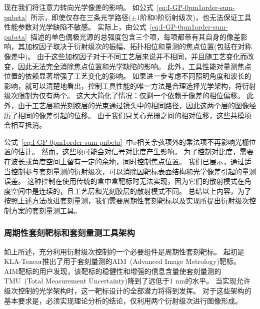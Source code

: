 现在我们将注意力转向光学像差的影响。
如公式~\eqref{eq:I-GP-0pm1order-sum-pnbeta}~所示，即使仅存在三条光学路径($\pm1$阶和$0$阶衍射级次)，也无法保证工具性能参数对光学缺陷不敏感。
实际上，由公式~\eqref{eq:I-GP-0pm1order-sum-pnbeta}~描述的单色偶极光源的总强度包含三个项，每项都带有其自身的像差影响，其加权因子取决于衍射级次的振幅、拓扑相位和量测的焦点位置(包括在对称像差中)。
由于这些加权因子对于不同工艺层来说并不相同，并且随工艺变化而改变，因此无法完全消除焦点位置和光学缺陷的影响。
此外，工具性能对量测焦点位置的依赖显著增强了工艺变化的影响。
如果进一步考虑不同照明角度和波长的影响，就可以清楚地看出，控制工具性能的唯一方法是合理选择光学架构，将衍射级次限制为仅有两个。
这大大简化了情况：仅剩一个依赖于像差的相位偏移。
此外，由于工艺层和光刻胶层的光束通过镜头中的相同路径，因此这两个层的图像经历了相同的像差引起的位移。
由于我们只关心光栅之间的相对位移，这些共模项会相互抵消。

公式~\eqref{eq:I-GP-0pm1order-sum-pnbeta}~中$x$相关余弦项外的乘法项不再影响光栅位置的估计。
然而，这些项可能会对信号对比度产生影响。
为了控制对比度，需要在波长或角度空间上留有一定的余地，同时控制焦点位置。
我们已展示，通过适当控制参与套刻量测的衍射级次，可以消除因靶标表面结构和光学像差引起的量测误差。
这种控制在使用传统的盒中盒靶标时无法实现，因为它们的散射模式在角度空间中是连续的，且工艺层和光刻胶层的散射模式不同。
总结以上内容，为了按照上述方法改进套刻量测，我们需要周期性套刻靶标以及实现所提出衍射级次控制方案的套刻量测工具。

\subsubsection{周期性套刻靶标和套刻量测工具架构~\label{周期性套刻靶标和套刻量测工具架构}}
如上所述，充分利用衍射级次控制的一个必要组件是周期性套刻靶标。
起初是KLA-Tencor推出了用于套刻量测的AIM~(Advanced Image Metrology)靶标。
AIM靶标的用户发现，该靶标的稳健性和增强的信息含量使套刻量测的TMU~(Total Measurement Uncertainty)降到了远低于1 nm的水平。
当实现允许级次控制的光学架构时，这一靶标设计的全部潜力将得到发挥。
对于这些架构的基本要求是，必须实现理论分析的结论，仅利用两个衍射级次进行图像形成。

